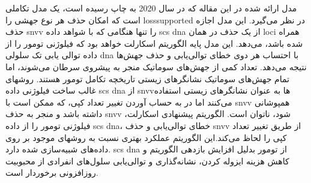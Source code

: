 مدل ارائه شده در این مقاله که در سال 2020 به چاپ رسیده است، یک مدل تکاملی است که امکان حذف هر نوع جهشی را  \gls{losssupported} در نظر می‌گیرد.  این مدل اجازه حذف \gls{snvv} را تنها هنگامی که با شواهد داده \gls{scs} \gls{dna} از یک حذف در همان \gls{loci} همراه شده باشد، می‌دهد. این مدل پایه الگوریتم اسکارلت خواهد بود که فیلوژنی تومور را از داده توالی یابی تک سلولی \gls{dna} با احتساب هر دوی خطای توالی‌یابی و حذف جهش‌ها نتیجه می‌دهد. 
تعداد کمی از جهش‌های سوماتیک منجر به پیشروی سرطان می‌شوند، اما تمام جهش‌های سوماتیک نشانگرهای زیستی تاریخچه تکامل تومور هستند. روشهای غالب ساخت فیلوژنی داده \gls{scs} \gls{dna} از \gls{snvv}ها به عنوان نشانگرهای زیستی استفاده می‌کنند اما در به حساب آوردن تغییر تعداد کپی، که ممکن است با \gls{snvv} همپوشانی داشته باشد و منجر به حذف \gls{snvv} شود، ناتوان است. 
الگوریتم پیشنهادی اسکارلت، فیلوژنی تومور را از داده \gls{scs} \gls{dna}، خطای توالی‌یابی و حذف \gls{snvv} از طریق تغییر تعداد کپی را لحاظ می‌کند.این الگوریتم عملکرد بهتری نسبت به روشهای موجود بر روی داده‌های شبیه‌سازی شده دارد. \gls{scs} \gls{dna} از تومور بدلیل افزایش بازدهی الگوریتم و کاهش هزینه ایزوله کردن، نشانه‌گذاری و توالی‌یابی سلول‌های انفرادی از محبوبیت روزافزونی برخوردار است. 
%
%
%
%
%
%

